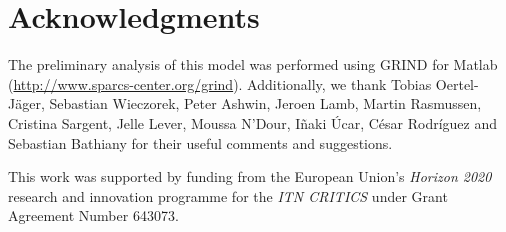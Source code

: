 \section{Acknowledgments}
\label{sec:Acknowledgments}
The preliminary analysis of this model was performed using GRIND for Matlab (\url{http://www.sparcs-center.org/grind}). Additionally, we thank Tobias Oertel-Jäger, Sebastian Wieczorek, Peter Ashwin, Jeroen Lamb, Martin Rasmussen, Cristina Sargent, Jelle Lever, Moussa N'Dour, Iñaki Úcar, César Rodríguez and Sebastian Bathiany for their useful comments and suggestions. 

This work was supported by funding from the European Union's \textit{Horizon 2020} research and innovation programme for the \textit{ITN CRITICS} under Grant Agreement Number 643073.
